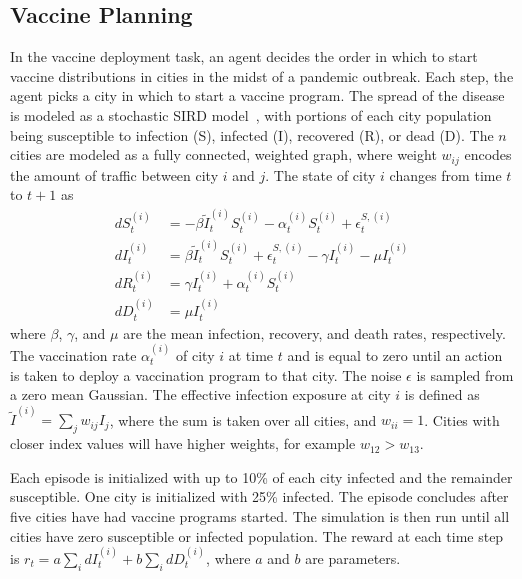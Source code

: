\documentclass[letterpaper]{article} %
\begin{document}
\subsection{Vaccine Planning}
In the vaccine deployment task, an agent decides the order in which to start vaccine distributions in cities in the midst of a pandemic outbreak. 
Each step, the agent picks a city in which to start a vaccine program.
The spread of the disease is modeled as a stochastic SIRD model~\cite{bailey1975}, with portions of each city population being susceptible to infection (S), infected (I), recovered (R), or dead (D). 
The $n$ cities are modeled as a fully connected, weighted graph, where weight $w_{ij}$ encodes the amount of traffic between city $i$ and $j$.
The state of city $i$ changes from time $t$ to $t+1$ as
\begin{align}
    dS^{(i)}_{t} &= -\beta \tilde{I}^{(i)}_t S^{(i)}_t - \alpha^{(i)}_t S^{(i)}_t +\epsilon^{S, (i)}_t \\
    dI^{(i)}_{t} &= \beta \tilde{I}^{(i)}_t S^{(i)}_t +\epsilon^{S, (i)}_t - \gamma I^{(i)}_t - \mu I^{(i)}_t \\
    dR^{(i)}_{t} &= \gamma I^{(i)}_t + \alpha^{(i)}_t S^{(i)}_t \\
    dD^{(i)}_{t} &= \mu I^{(i)}_t 
\end{align}
where $\beta$, $\gamma$, and $\mu$ are the mean infection, recovery, and death rates, respectively. 
The vaccination rate $\alpha^{(i)}_{t}$ of city $i$ at time $t$ and is equal to zero until an action is taken to deploy a vaccination program to that city.
The noise $\epsilon$ is sampled from a zero mean Gaussian. 
The effective infection exposure at city $i$ is defined as $\tilde{I}^{(i)} = \sum_j w_{ij}I_j$, where the sum is taken over all cities, and $w_{ii} = 1$.
Cities with closer index values will have higher weights, for example $w_{12} > w_{13}$.

Each episode is initialized with up to 10\% of each city infected and the remainder susceptible. 
One city is initialized with 25\% infected. 
The episode concludes after five cities have had vaccine programs started. 
The simulation is then run until all cities have zero susceptible or infected population.
The reward at each time step is $ r_t = a \sum_i dI^{(i)}_t + b \sum_i dD^{(i)}_t $, where $a$ and $b$ are parameters. 
\end{document}
